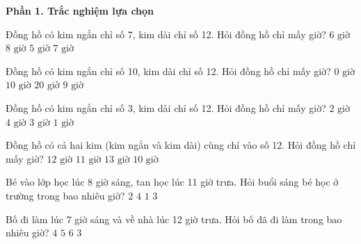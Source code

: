 \textbf{Phần 1. Trắc nghiệm lựa chọn}

\begin{ex} %
Đồng hồ có kim ngắn chỉ số 7, kim dài chỉ số 12. Hỏi đồng hồ chỉ mấy giờ?
\choice
{$6\text{ giờ}$}
{$8\text{ giờ}$}
{$5\text{ giờ}$}
{\True $7\text{ giờ}$}
\end{ex}

\begin{ex} %
Đồng hồ có kim ngắn chỉ số 10, kim dài chỉ số 12. Hỏi đồng hồ chỉ mấy giờ?
\choice
{$0\text{ giờ}$}
{\True $10\text{ giờ}$}
{$20\text{ giờ}$}
{$9\text{ giờ}$}
\end{ex}

\begin{ex} %
Đồng hồ có kim ngắn chỉ số 3, kim dài chỉ số 12. Hỏi đồng hồ chỉ mấy giờ?
\choice
{$2\text{ giờ}$}
{$4\text{ giờ}$}
{\True $3\text{ giờ}$}
{$1\text{ giờ}$}
\end{ex}

\begin{ex} %
Đồng hồ có cả hai kim (kim ngắn và kim dài) cùng chỉ vào số 12. Hỏi đồng hồ chỉ mấy giờ?
\choice
{\True $12\text{ giờ}$}
{$11\text{ giờ}$}
{$13\text{ giờ}$}
{$10\text{ giờ}$}
\end{ex}

\begin{ex} %
Bé vào lớp học lúc 8 giờ sáng, tan học lúc 11 giờ trưa. Hỏi buổi sáng bé học ở trường trong bao nhiêu giờ?
\choice
{$2$}
{$4$}
{$1$}
{\True $3$}
\end{ex}

\begin{ex} %
Bố đi làm lúc 7 giờ sáng và về nhà lúc 12 giờ trưa. Hỏi bố đã đi làm trong bao nhiêu giờ?
\choice
{$4$}
{\True $5$}
{$6$}
{$3$}
\end{ex}

